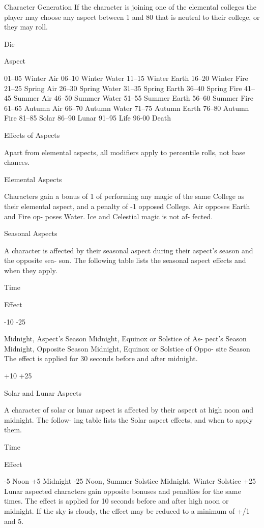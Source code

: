 \begin{Chapter}{Character Generation}
If  the  character  is  joining  one  of  the  elemental 
colleges the player may choose any aspect between 
1 and 80 that is neutral to their college, or they may 
roll. 

Die  

Aspect 

01–05   Winter Air 
06–10   Winter Water 
11–15   Winter Earth 
16–20   Winter Fire 
21–25   Spring Air 
26–30   Spring Water 
31–35   Spring Earth 
36–40   Spring Fire 
41–45   Summer Air 
46–50   Summer Water 
51–55   Summer Earth 
56–60   Summer Fire 
61–65   Autumn Air 
66–70   Autumn Water 
71–75   Autumn Earth 
76–80   Autumn Fire 
81–85   Solar 
86–90   Lunar 
91–95   Life 
96-00   Death 

Effects of Aspects 

Apart  from  elemental  aspects,  all  modifiers  apply 
to percentile rolls, not base chances. 

Elemental Aspects 

Characters gain a bonus of 1%
of  performing  any  magic  of  the  same  College  as 
their elemental aspect, and a penalty of -1%
opposed  College.  Air  opposes  Earth  and  Fire  op-
poses  Water.  Ice  and  Celestial  magic  is  not  af-
fected. 

Seasonal Aspects 

A  character  is  affected  by  their  seasonal  aspect 
during  their  aspect’s  season  and  the  opposite  sea-
son.  The  following  table  lists  the  seasonal  aspect 
effects and when they apply. 

Time  

Effect 

-10 
-25 

Midnight, Aspect’s Season  
Midnight, Equinox or Solstice of As-
pect’s Season  
Midnight, Opposite Season  
Midnight, Equinox or Solstice of Oppo-
site Season  
The  effect  is  applied  for  30  seconds  before  and 
after midnight. 

+10 
+25 

Solar and Lunar Aspects 

A  character  of  solar  or  lunar  aspect  is  affected  by 
their aspect at high noon and midnight. The follow-
ing table lists the Solar aspect effects, and when to 
apply them. 

Time  

Effect 

-5 
Noon  
+5 
Midnight  
-25 
Noon, Summer Solstice  
Midnight, Winter Solstice   +25 
Lunar  aspected  characters  gain  opposite  bonuses 
and  penalties  for  the  same  times.  The  effect  is 
applied  for  10  seconds  before  and  after  high  noon 
or midnight. If the sky is cloudy, the effect may be 
reduced to a minimum of +/1 and 5. 


\end{Chapter}
